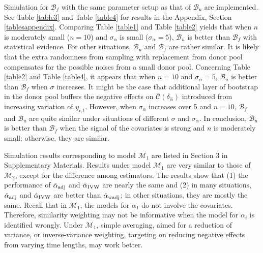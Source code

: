 \documentclass[11pt,3p,review,authoryear]{elsarticle}
\def\mc#1{\mathcal{#1}} %
\theoremstyle{definition}
\begin{document}
Simulation for $\mc{B}_f$ with the same parameter setup as that of $\mc{B}_u$ are implemented. See Table \ref{table3} and Table \ref{table4} for results in the Appendix, Section \ref{tablesappendix}. Comparing Table \ref{table1}
 and Table \ref{table2} yields that when $n$ is moderately small ($n = 10$) and $\sigma_{\alpha}$ is small ($\sigma_{\alpha}=5$), $\mc{B}_u$ is better than $\mc{B}_f$ with statistical evidence. For other situations, $\mc{B}_u$  and $\mc{B}_f$  are rather similar. It is likely that the extra randomness from sampling with replacement from donor pool compensates for the possible noises from a small donor pool. Concerning  Table \ref{table2} and Table \ref{table4}, it appears that when $n = 10$ and $\sigma_{\alpha}=5$, $\mc{B}_u$ is better than  $\mc{B}_f$  when $\sigma$ increases. It might be the case that additional layer of bootstrap in the donor pool buffers the negative effects on $\bar{\mc{C}}(\delta_{\hat{\alpha}})$  introduced from increasing variation of $y_{i,t}$. However, when $\sigma_{\alpha}$ increases over 5 and $n = 10$,  $\mc{B}_f$ and $\mc{B}_u$ are quite similar under  situations of different $\sigma$ and $\sigma_{\alpha}$. In conclusion, $\mc{B}_u$ is better than $\mc{B}_f$ when the signal of the covariates is strong and $n$ is moderately small; otherwise, they are similar. 
 
 Simulation results corresponding to model $\mc{M}_1$ are listed in Section 3 in Supplementary Materials. Results under model $\mc{M}_1$ are very similar to those of $\mc{M}_2$, except for the difference among estimators. The results show that (1) the performance of $\hat{\alpha}_{\rm adj}$ and  $\hat{\alpha}_{\rm IVW}$ are nearly the same and (2) in many situations, $\hat{\alpha}_{\rm adj}$ and  $\hat{\alpha}_{\rm IVW}$ are  better than $\hat{\alpha}_{\rm wadj}$; in other situations, they are mostly the same. Recall that in $\mc{M}_1$, the models for $\alpha_1$ do not involve the covariates. Therefore, similarity weighting may not be informative when the model for $\alpha_i$ is identified wrongly. Under $\mc{M}_1$, simple averaging, aimed for a reduction of variance, or inverse-variance weighting, targeting on reducing negative effects from varying time lengths, may work better.
\end{document}
